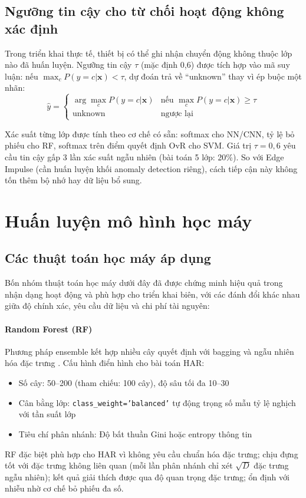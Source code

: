 \subsection{Ngưỡng tin cậy cho từ chối hoạt động không xác định}
\label{sec:confidence_threshold}

Trong triển khai thực tế, thiết bị có thể ghi nhận chuyển động không thuộc lớp nào đã huấn luyện. Ngưỡng tin cậy $\tau$ (mặc định 0,6) được tích hợp vào mã suy luận: nếu $\max_c P(y=c|\mathbf{x}) < \tau$, dự đoán trả về ``unknown'' thay vì ép buộc một nhãn:
\begin{equation}
    \hat{y} = \begin{cases}
        \arg\max_c P(y=c|\mathbf{x}) & \text{nếu } \max_c P(y=c|\mathbf{x}) \geq \tau \\
        \text{unknown} & \text{ngược lại}
    \end{cases}
\end{equation}

Xác suất từng lớp được tính theo cơ chế có sẵn: softmax cho NN/CNN, tỷ lệ bỏ phiếu cho RF, softmax trên điểm quyết định OvR cho SVM. Giá trị $\tau = 0{,}6$ yêu cầu tin cậy gấp 3 lần xác suất ngẫu nhiên (bài toán 5 lớp: 20\%). So với Edge Impulse (cần huấn luyện khối anomaly detection riêng), cách tiếp cận này không tốn thêm bộ nhớ hay dữ liệu bổ sung.

\section{Huấn luyện mô hình học máy}

\subsection{Các thuật toán học máy áp dụng}
Bốn nhóm thuật toán học máy dưới đây đã được chứng minh hiệu quả trong nhận dạng hoạt động và phù hợp cho triển khai biên, với các đánh đổi khác nhau giữa độ chính xác, yêu cầu dữ liệu và chi phí tài nguyên:

\paragraph{Random Forest (RF)}
Phương pháp ensemble kết hợp nhiều cây quyết định với bagging và ngẫu nhiên hóa đặc trưng \cite{breiman2001random}. Cấu hình điển hình cho bài toán HAR:
\begin{itemize}
    \item Số cây: 50--200 (tham chiếu: 100 cây), độ sâu tối đa 10--30
    \item Cân bằng lớp: \texttt{class\_weight='balanced'} tự động trọng số mẫu tỷ lệ nghịch với tần suất lớp
    \item Tiêu chí phân nhánh: Độ bất thuần Gini hoặc entropy thông tin
\end{itemize}
RF đặc biệt phù hợp cho HAR vì không yêu cầu chuẩn hóa đặc trưng; chịu đựng tốt với đặc trưng không liên quan (mỗi lần phân nhánh chỉ xét $\sqrt{D}$ đặc trưng ngẫu nhiên); kết quả giải thích được qua độ quan trọng đặc trưng; ổn định với nhiễu nhờ cơ chế bỏ phiếu đa số.

